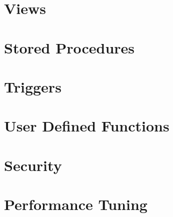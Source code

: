 \section{Views}
\section{Stored Procedures}
\section{Triggers}
\section{User Defined Functions}
\section{Security}
\section{Performance Tuning}


